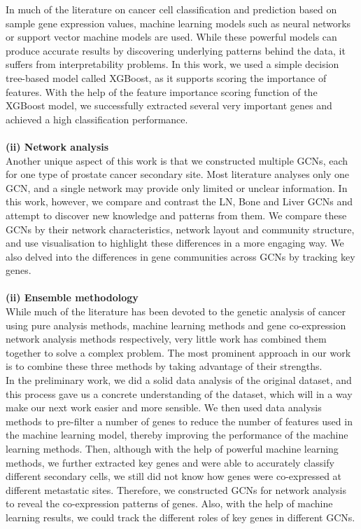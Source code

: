 \documentclass[12pt,a4paper]{report}
\begin{document}
In much of the literature on cancer cell classification and prediction based on sample gene expression values, machine learning models such as neural networks or support vector machine models are used. While these powerful models can produce accurate results by discovering underlying patterns behind the data, it suffers from interpretability problems. In this work, we used a simple decision tree-based model called XGBoost, as it supports scoring the importance of features. With the help of the feature importance scoring function of the XGBoost model, we successfully extracted several very important genes and achieved a high classification performance.\\

\quad\\
\textbf{(ii) Network analysis} \\

Another unique aspect of this work is that we constructed multiple GCNs, each for one type of prostate cancer secondary site. Most literature analyses only one GCN, and a single network may provide only limited or unclear information. In this work, however, we compare and contrast the LN, Bone and Liver GCNs and attempt to discover new knowledge and patterns from them. We compare these GCNs by their network characteristics, network layout and community structure, and use visualisation to highlight these differences in a more engaging way. We also delved into the differences in gene communities across GCNs by tracking key genes.\\

\quad\\
\textbf{(ii) Ensemble methodology} \\

While much of the literature has been devoted to the genetic analysis of cancer using pure analysis methods, machine learning methods and gene co-expression network analysis methods respectively, very little work has combined them together to solve a complex problem. The most prominent approach in our work is to combine these three methods by taking advantage of their strengths.\\


In the preliminary work, we did a solid data analysis of the original dataset, and this process gave us a concrete understanding of the dataset, which will in a way make our next work easier and more sensible. We then used data analysis methods to pre-filter a number of genes to reduce the number of features used in the machine learning model, thereby improving the performance of the machine learning methods. Then, although with the help of powerful machine learning methods, we further extracted key genes and were able to accurately classify different secondary cells, we still did not know how genes were co-expressed at different metastatic sites. Therefore, we constructed GCNs for network analysis to reveal the co-expression patterns of genes. Also, with the help of machine learning results, we could track the different roles of key genes in different GCNs.\\
\end{document}
